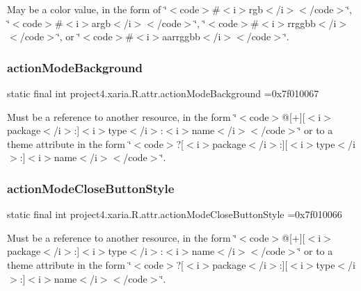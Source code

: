May be a color value, in the form of \char`\"{}$<$code$>$\#$<$i$>$rgb$<$/i$>$$<$/code$>$\char`\"{}, \char`\"{}$<$code$>$\#$<$i$>$argb$<$/i$>$$<$/code$>$\char`\"{}, \char`\"{}$<$code$>$\#$<$i$>$rrggbb$<$/i$>$$<$/code$>$\char`\"{}, or \char`\"{}$<$code$>$\#$<$i$>$aarrggbb$<$/i$>$$<$/code$>$\char`\"{}. \mbox{\label{classproject4_1_1xaria_1_1R_1_1attr_ac8a7071e16b604cd5ed28ea9eda53dd9}} 
\subsubsection{\texorpdfstring{action\+Mode\+Background}{actionModeBackground}}
{\footnotesize\ttfamily static final int project4.\+xaria.\+R.\+attr.\+action\+Mode\+Background =0x7f010067\hspace{0.3cm}{\ttfamily [static]}}

Must be a reference to another resource, in the form \char`\"{}$<$code$>$@\mbox{[}+\mbox{]}\mbox{[}$<$i$>$package$<$/i$>$\+:\mbox{]}$<$i$>$type$<$/i$>$\+:$<$i$>$name$<$/i$>$$<$/code$>$\char`\"{} or to a theme attribute in the form \char`\"{}$<$code$>$?\mbox{[}$<$i$>$package$<$/i$>$\+:\mbox{]}\mbox{[}$<$i$>$type$<$/i$>$\+:\mbox{]}$<$i$>$name$<$/i$>$$<$/code$>$\char`\"{}. \mbox{\label{classproject4_1_1xaria_1_1R_1_1attr_afbbadc301530efdd76096a0842b70605}} 
\subsubsection{\texorpdfstring{action\+Mode\+Close\+Button\+Style}{actionModeCloseButtonStyle}}
{\footnotesize\ttfamily static final int project4.\+xaria.\+R.\+attr.\+action\+Mode\+Close\+Button\+Style =0x7f010066\hspace{0.3cm}{\ttfamily [static]}}

Must be a reference to another resource, in the form \char`\"{}$<$code$>$@\mbox{[}+\mbox{]}\mbox{[}$<$i$>$package$<$/i$>$\+:\mbox{]}$<$i$>$type$<$/i$>$\+:$<$i$>$name$<$/i$>$$<$/code$>$\char`\"{} or to a theme attribute in the form \char`\"{}$<$code$>$?\mbox{[}$<$i$>$package$<$/i$>$\+:\mbox{]}\mbox{[}$<$i$>$type$<$/i$>$\+:\mbox{]}$<$i$>$name$<$/i$>$$<$/code$>$\char`\"{}. \mbox{\label{classproject4_1_1xaria_1_1R_1_1attr_ad271e28eff4cc7a5d48e50f3d6525ac9}} 
